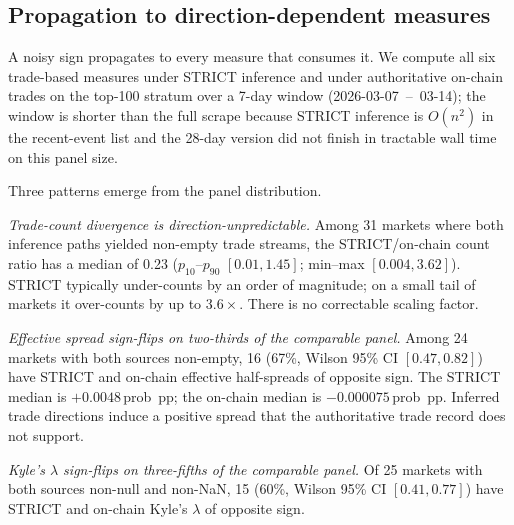 \subsection{Propagation to direction-de\-pen\-dent measures}\label{ssec:strict-vs-onchain}

A noisy sign propagates to every measure that consumes it. We compute
all six trade-based measures under STRICT inference and under
authoritative on-chain trades on the top-100 stratum over a 7-day
window (2026-03-07~--~03-14); the window is shorter than the full
scrape because STRICT inference is $O(n^2)$ in the recent-event list
and the 28-day version did not finish in tractable wall time on this
panel size.

Three patterns emerge from the panel distribution.

\textit{Trade-count divergence is direction-un\-pre\-dict\-able.}
Among 31 markets where both inference paths yielded non-empty trade
streams, the STRICT/on-chain count ratio has a median of 0.23
($p_{10}$--$p_{90}$ $[0.01, 1.45]$; min--max $[0.004, 3.62]$).
STRICT typically under-counts by an order of magnitude; on a small
tail of markets it over-counts by up to $3.6\times$. There is no
correctable scaling factor.

\textit{Effective spread sign-flips on two-thirds of the comparable
panel.} Among 24 markets with both sources non-empty,
16 (67\%, Wilson 95\% CI $[0.47, 0.82]$) have STRICT and on-chain
effective half-spreads of opposite sign. The STRICT median is
$+0.0048$\,prob~pp; the on-chain median is $-0.000075$\,prob~pp.
Inferred trade directions induce a positive spread that the
authoritative trade record does not support.

\textit{Kyle's $\lambda$ sign-flips on three-fifths of the comparable
panel.} Of 25 markets with both sources non-null and non-NaN, 15
(60\%, Wilson 95\% CI $[0.41, 0.77]$) have STRICT and on-chain
Kyle's $\lambda$ of opposite sign.

